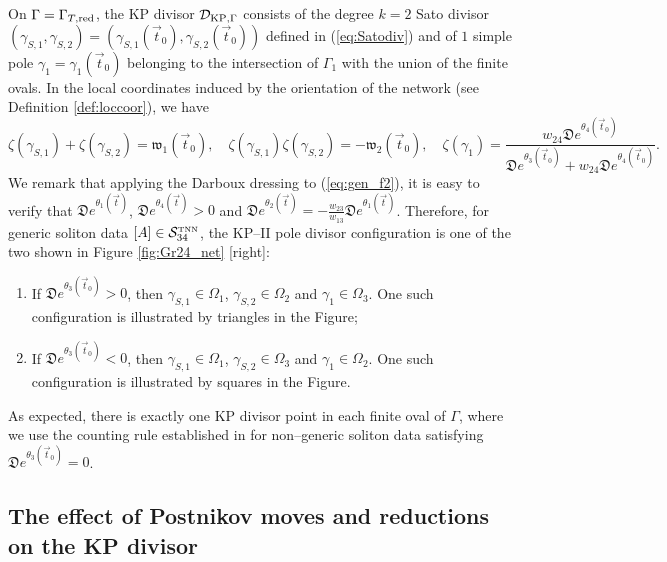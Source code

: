 \documentclass[11pt]{amsart}
\theoremstyle{plain}
\numberwithin{equation}{section}
\def \DKP {{\mathcal D}_{\textup{\scriptsize KP},\Gamma}}
\begin{document}
On $\Gamma=\Gamma_{T,\mbox{\scriptsize red}}$, the KP divisor $\DKP$ consists of the degree $k=2$ Sato divisor $(\gamma_{S,1} ,\gamma_{S,2} )=(\gamma_{S,1} (\vec t_0),\gamma_{S,2} (\vec t_0))$ defined in (\ref{eq:Satodiv}) and of $1$ simple pole $\gamma_{1}=\gamma_{1} (\vec t_0)$ belonging to the intersection of 
$\Gamma_{1}$ with the union of the finite ovals. In the local coordinates induced by the orientation of the network (see Definition \ref{def:loccoor}), we have
\begin{equation}\label{eq:ex_div1}
\zeta(\gamma_{S,1}) +\zeta(\gamma_{S,2}) = {\mathfrak w}_1 (\vec t_0), \quad  \zeta(\gamma_{S,1})\zeta(\gamma_{S,2}) = -{\mathfrak w}_2 (\vec t_0), \quad
\zeta(\gamma_{1}) = \frac{w_{24} {\mathfrak D} e^{\theta_4(\vec t_0)}}{{\mathfrak D} e^{\theta_3(\vec t_0)}+ w_{24} 
{\mathfrak D} e^{\theta_4(\vec t_0)}}.
\end{equation}
We remark that applying the Darboux dressing to (\ref{eq:gen_f2}), it is easy to verify that ${\mathfrak D} e^{\theta_1(\vec t)}$, ${\mathfrak D} e^{\theta_4(\vec t)}>0$ and ${\mathfrak D} e^{\theta_2(\vec t)} = - \frac{w_{23}}{w_{13}}{\mathfrak D} e^{\theta_1(\vec t)}$. Therefore, for generic soliton data $[A]\in {\mathcal S}_{34}^{\mbox{\tiny TNN}}$, the KP--II pole divisor configuration is one of the two shown in Figure \ref{fig:Gr24_net} [right]:
\begin{enumerate}
\item If ${\mathfrak D} e^{\theta_3(\vec t_0)}>0$, then $\gamma_{S,1} \in \Omega_1$, $\gamma_{S,2} \in \Omega_2$ and $\gamma_{1} \in \Omega_3$. One such configuration is illustrated by triangles in the Figure;
\item If ${\mathfrak D} e^{\theta_3(\vec t_0)}<0$, then $\gamma_{S,1} \in \Omega_1$, $\gamma_{S,2} \in \Omega_3$ and $\gamma_{1} \in \Omega_2$. One such configuration is illustrated by squares in the Figure.
\end{enumerate}
As expected, there is exactly one KP divisor point in each finite oval of $\Gamma$, where we use the counting rule established in \cite{AG1} for non--generic soliton data satisfying ${\mathfrak D} e^{\theta_3(\vec t_0)}=0$.

\subsection{The effect of Postnikov moves and reductions on the KP divisor}
\end{document}
